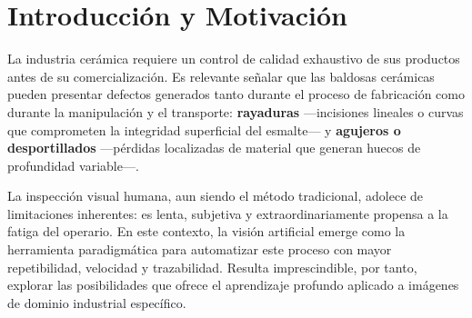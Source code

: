 \documentclass[12pt,a4paper]{article}
\begin{document}
\begin{abstract}
\noindent
El presente trabajo documenta el desarrollo íntegro de un sistema de visión artificial
orientado a la detección y cuantificación automática de defectos superficiales en
baldosas cerámicas industriales. La tipología de defectos contemplada abarca dos
categorías fundamentales: rayaduras —incisiones lineales o curvas sobre el esmalte—
y agujeros o desportillados —pérdidas puntuales de material—.

El pipeline construido comprende cinco fases integradas: adquisición y selección de
imágenes; preprocesado, etiquetado manual con Label Studio y etiquetado automático
por pseudo-labeling; entrenamiento de la red YOLOv8m-seg en GPU mediante la
plataforma Kaggle; un módulo de inferencia capaz de calcular la longitud, grosor y
área de cada defecto en milímetros reales; y una aplicación web interactiva construida
con FastAPI y HTML/JavaScript que permite inspeccionar cualquier imagen desde el
navegador y exportar el informe de resultados.

Los resultados sobre el conjunto de validación arrojan un Box\,mAP@0.5\,=\,0.806 y
Mask\,mAP@0.5\,=\,0.520, con tiempos de inferencia de aproximadamente 480\,ms en CPU.
El dataset final de entrenamiento consta de 2\,978 imágenes (2\,532 train + 446 val),
construido a partir de 148 anotaciones manuales ampliadas mediante pseudo-labeling
y aumentos con Albumentations.
\end{abstract}
\newpage

\tableofcontents
\newpage

\section{Introducción y Motivación}

La industria cerámica requiere un control de calidad exhaustivo de sus productos antes
de su comercialización. Es relevante señalar que las baldosas cerámicas pueden presentar
defectos generados tanto durante el proceso de fabricación como durante la manipulación
y el transporte: \textbf{rayaduras} —incisiones lineales o curvas que comprometen la
integridad superficial del esmalte— y \textbf{agujeros o desportillados} —pérdidas
localizadas de material que generan huecos de profundidad variable—.

La inspección visual humana, aun siendo el método tradicional, adolece de limitaciones
inherentes: es lenta, subjetiva y extraordinariamente propensa a la fatiga del operario.
En este contexto, la visión artificial emerge como la herramienta paradigmática para
automatizar este proceso con mayor repetibilidad, velocidad y trazabilidad. Resulta
imprescindible, por tanto, explorar las posibilidades que ofrece el aprendizaje profundo
aplicado a imágenes de dominio industrial específico.
\end{document}
